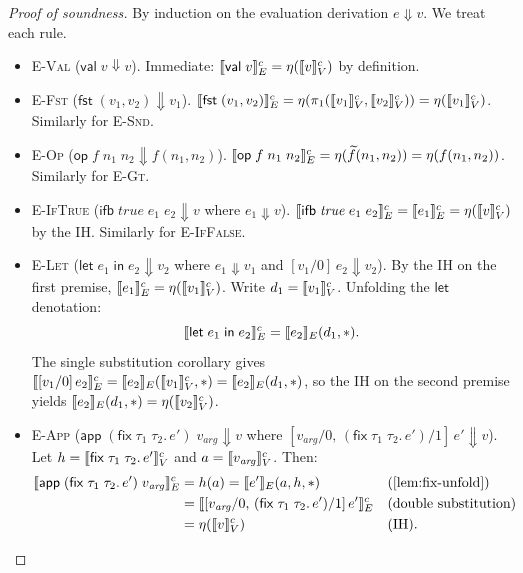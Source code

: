 \begin{proof}[Proof of soundness]
By induction on the evaluation derivation $e \Downarrow v$.  We treat
each rule.
\begin{itemize}
  \item \textsc{E-Val} ($\mathsf{val}\;v \Downarrow v$).  Immediate:
    $\llbracket \mathsf{val}\;v \rrbracket^c_E = \eta(\llbracket v \rrbracket^c_V)$ by definition.

  \item \textsc{E-Fst} ($\mathsf{fst}\;(v_1, v_2) \Downarrow v_1$).
    $\llbracket \mathsf{fst}\;(v_1, v_2) \rrbracket^c_E
    = \eta(\pi_1(\llbracket v_1 \rrbracket^c_V, \llbracket v_2 \rrbracket^c_V))
    = \eta(\llbracket v_1 \rrbracket^c_V)$.
    Similarly for \textsc{E-Snd}.

  \item \textsc{E-Op} ($\mathsf{op}\;f\;n_1\;n_2 \Downarrow
    f(n_1,n_2)$).
    $\llbracket \mathsf{op}\;f\;n_1\;n_2 \rrbracket^c_E
    = \eta(\widetilde{f}(n_1, n_2)) = \eta(f(n_1, n_2))$.
    Similarly for \textsc{E-Gt}.

  \item \textsc{E-IfTrue}
    ($\mathsf{ifb}\;\mathit{true}\;e_1\;e_2 \Downarrow v$ where
    $e_1 \Downarrow v$).
    $\llbracket \mathsf{ifb}\;\mathit{true}\;e_1\;e_2 \rrbracket^c_E
    = \llbracket e_1 \rrbracket^c_E = \eta(\llbracket v \rrbracket^c_V)$
    by the IH.  Similarly for \textsc{E-IfFalse}.

  \item \textsc{E-Let} ($\mathsf{let}\;e_1\;\mathsf{in}\;e_2
    \Downarrow v_2$ where $e_1 \Downarrow v_1$ and
    $[v_1/0]\,e_2 \Downarrow v_2$).
    By the IH on the first premise,
    $\llbracket e_1 \rrbracket^c_E = \eta(\llbracket v_1 \rrbracket^c_V)$.
    Write $d_1 = \llbracket v_1 \rrbracket^c_V$.  Unfolding the $\mathsf{let}$
    denotation:
    \[
      \llbracket \mathsf{let}\;e_1\;\mathsf{in}\;e_2 \rrbracket^c_E
      = \llbracket e_2 \rrbracket_E(d_1, \ast).
    \]
    The single substitution corollary gives
    $\llbracket [v_1/0]\,e_2 \rrbracket^c_E = \llbracket e_2 \rrbracket_E(\llbracket v_1 \rrbracket^c_V, \ast)
    = \llbracket e_2 \rrbracket_E(d_1, \ast)$, so the IH on the second premise yields
    $\llbracket e_2 \rrbracket_E(d_1, \ast) = \eta(\llbracket v_2 \rrbracket^c_V)$.

  \item \textsc{E-App}
    ($\mathsf{app}\;(\mathsf{fix}\;\tau_1\;\tau_2.\,e')\;
    v_{\mathit{arg}} \Downarrow v$ where
    $[v_{\mathit{arg}}/0,\,
    (\mathsf{fix}\;\tau_1\;\tau_2.\,e')/1]\,e' \Downarrow v$).
    Let $h = \llbracket \mathsf{fix}\;\tau_1\;\tau_2.\,e' \rrbracket^c_V$ and
    $a = \llbracket v_{\mathit{arg}} \rrbracket^c_V$.  Then:
    \begin{align*}
      \sem{\mathsf{app}\;(\mathsf{fix}\;\tau_1\;\tau_2.\,e')\;
        v_{\mathit{arg}}}^c_E
      &= h(a)
       = \sem{e'}_E(a, h, \ast)
         && \text{(\cref{lem:fix-unfold})} \\
      &= \sem{[v_{\mathit{arg}}/0,\,
              (\mathsf{fix}\;\tau_1\;\tau_2.\,e')/1]\,e'}^c_E
         && \text{(double substitution)} \\
      &= \eta(\sem{v}^c_V)
         && \text{(IH).}
    \end{align*}
\end{itemize}
\vspace{-0.5em}
\end{proof}

